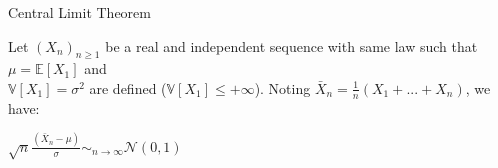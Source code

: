 Central Limit Theorem

Let $(X_n)_{n \ge 1}$ be a real and independent sequence with same law such that $\mu = \mathbb{E}[X_1]$ and \\
$\mathbb{V}[X_1]=\sigma^2$ are defined ($\mathbb{V}[X_1] \leq +\infty$). Noting $\bar{X}_n=\frac{1}{n}(X_1 + ... + X_n)$, we have:
\begin{center}
$\sqrt{n}\frac{(\bar{X}_n-\mu)}{\sigma} \sim_{n \to \infty} \mathcal{N}(0,1)$
\end{center}

\vspace{5mm}